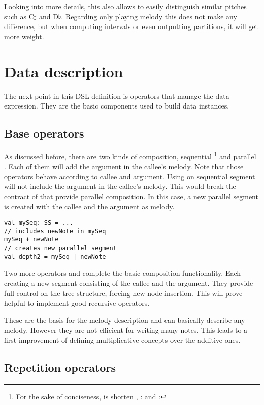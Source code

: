 \documentclass[twocolumn, 11pt]{article}
\begin{document}
Looking into more details, this also allows to easily distinguish similar pitches such as C$\sharp$ and D$\flat$. Regarding only playing melody this does not make any difference, but when computing intervals or even outputting partitions, it will get more weight.

\section{Data description}

The next point in this DSL definition is operators that manage the data expression.
They are the basic components used to build data instances.


\subsection{Base operators}

As discussed before, there are two kinds of composition, sequential \footnote{For the sake of conciseness,  is shorten ,  :  and  : } and parallel . Each of them will add the  argument in the callee's melody. Note that those operators behave according to callee and argument. Using \lln{|} on sequential segment will not include the argument in the callee's melody. This would break the contract of \lln{|} that provide parallel composition. In this case, a new parallel segment is created with the callee and the argument as melody.
\begin{lstlisting}
val mySeq: SS = ...
// includes newNote in mySeq
mySeq + newNote
// creates new parallel segment
val depth2 = mySeq | newNote
\end{lstlisting}

Two more operators  and  complete the basic composition functionality. Each creating a new segment consisting of the callee and the argument. They provide full control on the tree structure, forcing new node insertion. This will prove helpful to implement good recursive operators.

These are the basis for the melody description and can basically describe any melody. However they are not efficient for writing many notes. This leads to a first improvement of defining multiplicative concepts over the additive ones.

\subsection{Repetition operators}
\end{document}
